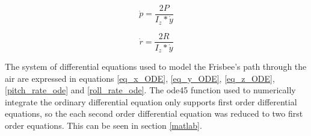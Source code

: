 \documentclass[12pt,twoside,letterpaper]{article}
\begin{document}
\begin{multicols}{2}
\begin{equation}
    \dot{p} = \frac{2P}{I_{z}*\dot{y}}
    \label{pitch_rate_ode}
\end{equation}

\begin{equation}
    \dot{r} = \frac{2R}{I_{z}*\dot{y}}
    \label{roll_rate_ode}
\end{equation}

The system of differential equations used to model the Frisbee's path through the air are expressed in equations \eqref{eq_x_ODE}, \eqref{eq_y_ODE}, \eqref{eq_z_ODE}, \eqref{pitch_rate_ode} and \eqref{roll_rate_ode}. The ode45 function used to numerically integrate the ordinary differential equation only supports first order differential equations, so the each second order differential equation was reduced to two first order equations. This can be seen in section \ref{matlab}.

\newpage


\end{multicols}
\end{document}
